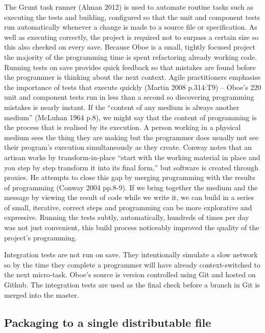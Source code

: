 \documentclass[12pt, ]{article}
\begin{document}
The Grunt task runner (Alman 2012) is used to automate routine tasks
such as executing the tests and building, configured so that the unit
and component tests run automatically whenever a change is made to a
source file or specification. As well as executing correctly, the
project is required not to surpass a certain size so this also checked
on every save. Because Oboe is a small, tightly focused project the
majority of the programming time is spent refactoring already working
code. Running tests on save provides quick feedback so that mistakes are
found before the programmer is thinking about the next context. Agile
practitioners emphasise the importance of tests that execute quickly
(Martin 2008 p.314:T9) -- Oboe's 220 unit and component tests run in
less than a second so discovering programming mistakes is nearly
instant. If the ``content of any medium is always another medium''
(McLuhan 1964 p.8), we might say that the content of programming is the
process that is realised by its execution. A person working in a
physical medium sees the thing they are making but the programmer does
usually not see their program's execution simultaneously as they create.
Conway notes that an artisan works by transform-in-place ``start with
the working material in place and you step by step transform it into its
final form,'' but software is created through proxies. He attempts to
close this gap by merging programming with the results of programming
(Conway 2004 pp.8-9). If we bring together the medium and the message by
viewing the result of code while we write it, we can build in a series
of small, iterative, correct steps and programming can be more
explorative and expressive. Running the tests subtly, automatically,
hundreds of times per day was not just convenient, this build process
noticeably improved the quality of the project's programming.

Integration tests are not run on save. They intentionally simulate a
slow network so by the time they complete a programmer will have already
context-switched to the next micro-task. Oboe's source is version
controlled using Git and hosted on Github. The integration tests are
used as the final check before a branch in Git is merged into the
master.

\subsection{Packaging to a single distributable
file}\label{packaging-to-a-single-distributable-file}
\end{document}
